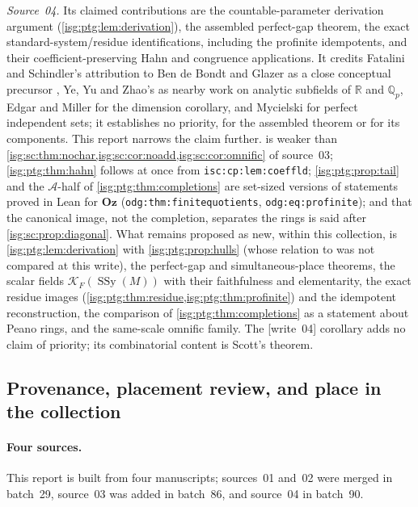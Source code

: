 \documentclass[11pt]{article}
\theoremstyle{definition}
\theoremstyle{remark}
\newcommand{\Oz}{\ensuremath{\mathbf{Oz}}}
\newcommand{\R}{\mathbb{R}}
\newcommand{\Asc}{\mathcal{A}}
\newcommand{\Qp}{\mathbb{Q}_p}
\newcommand{\SSy}{\operatorname{SSy}}
\newcommand{\replabel}[1]{\nolinkurl{#1}}
\begin{document}
\emph{Source~04.} Its claimed contributions are the countable-parameter
derivation argument (\cref{isg:ptg:lem:derivation}), the assembled
perfect-gap theorem, the exact standard-system/residue identifications,
including the profinite idempotents, and their coefficient-preserving Hahn
and congruence applications. It credits Fatalini and Schindler's
attribution to Ben de Bondt and Glazer as a close conceptual precursor
\cite[Section~2]{FataliniSchindler}, Ye, Yu and Zhao's
\cite[Proposition~2.6]{YeYuZhao} as nearby work on analytic subfields of
$\R$ and $\Qp$, Edgar and Miller for the dimension corollary, and Mycielski
for perfect independent sets; it establishes no priority, for the
assembled theorem or for its components. This report narrows the claim
further.  is weaker than
\cref{isg:sc:thm:nochar,isg:sc:cor:noadd,isg:sc:cor:omnific} of source~03;
\cref{isg:ptg:thm:hahn} follows at once from
\replabel{isc:cp:lem:coeffld}; \cref{isg:ptg:prop:tail} and the
$\Asc$-half of \cref{isg:ptg:thm:completions} are set-sized versions of
statements proved in Lean for $\Oz$ (\replabel{odg:thm:finitequotients},
\replabel{odg:eq:profinite}); and that the canonical image, not the
completion, separates the rings is said after \cref{isg:sc:prop:diagonal}.
What remains proposed as new, within this collection, is
\cref{isg:ptg:lem:derivation} with \cref{isg:ptg:prop:hulls} (whose
relation to \cite[Proposition~2.6]{YeYuZhao} was not compared at this
write), the perfect-gap and simultaneous-place theorems, the scalar fields
$\mathcal K_F(\SSy(M))$ with their faithfulness and elementarity, the exact
residue images (\cref{isg:ptg:thm:residue,isg:ptg:thm:profinite}) and the
idempotent reconstruction, the comparison of
\cref{isg:ptg:thm:completions} as a statement about Peano rings, and the
same-scale omnific family. The \textup{[write~04]} corollary adds no claim
of priority; its combinatorial content is Scott's theorem.

\subsection{Provenance, placement review, and place in the collection}
\label{isg:sec:provenance}

\paragraph{Four sources.} This report is built from four manuscripts;
sources~01 and~02 were merged in batch~29, source~03 was added in
batch~86, and source~04 in batch~90.
\end{document}
